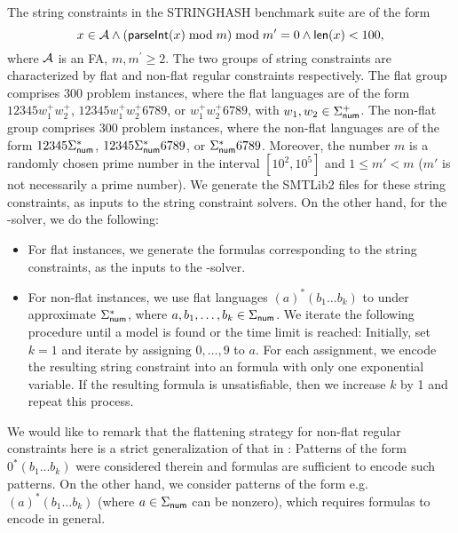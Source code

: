 The string constraints in the STRINGHASH benchmark suite are of the form 
$$x \in \mathcal{A} \wedge \left( \textsf{parseInt}(x) \bmod m \right) \bmod m^\prime = 0   \notag \wedge \textsf{len}(x) < 100,$$ 
where $\mathcal{A}$ is an FA, $m, m^\prime \ge 2.$ 
The two groups of string constraints are characterized by flat and non-flat regular constraints respectively.
The flat group comprises 300 problem instances, where the flat languages are of the form $12345w^+_1 w^+_2$,  $12345 w^+_1  w^+_2 6789$, or $w^+_1 w^+_2 6789$, with $w_1,w_2 \in \Sigma^+_{\sf num}$. The non-flat group comprises 300 problem instances, where the non-flat languages are of the form $12345\Sigma_{\sf num}^*$, $12345\Sigma_{\sf num}^* 6789$, or $\Sigma_{\sf num}^* 6789$. Moreover, the number $m$ is a randomly chosen prime number in the interval $[10^2, 10^5]$ and $1 \le m' < m$ ($m'$ is not necessarily a prime number). We generate the SMTLib2 files for these string constraints, as inputs to the string constraint solvers. On the other hand, for the {\paexp}-solver, we do the following:   
\begin{itemize}
\item For flat instances, we generate the {\paexp} formulas corresponding to the string constraints, as the inputs to the {\paexp}-solver.
%
\item For non-flat instances, we use flat languages $(a)^* (b_{1} \ldots b_{k})$ to under approximate 
$\Sigma_{\sf num}^*$,  where $a, b_1,\ldots, b_k \in \Sigma_{\sf num}$. 
%
%
We iterate the following procedure until a model is found or the time limit is reached: Initially, set $k=1$ and iterate by assigning $0, \ldots, 9$ to $a$. For each assignment, we encode the resulting string constraint into an {\paexp} formula with only one exponential variable. If the resulting {\paexp} formula is unsatisfiable, then we increase $k$ by 1 and repeat this process. 
\end{itemize}
We would like to remark that the flattening strategy for non-flat regular constraints here is a strict generalization of that in \cite{Parosh:20:PLDI}: Patterns of the form $0^*(b_1...b_k)$ were considered therein and {\pa} formulas are sufficient to encode such patterns. On the other hand, we consider patterns of the form e.g. $(a)^* (b_1 \ldots b_k)$ (where $a \in \Sigma_{\sf num}$ can be nonzero), which requires {\paexp} formulas to encode in general.

